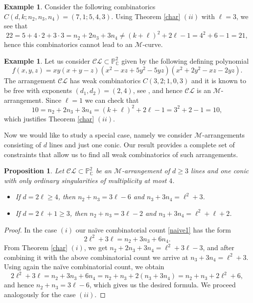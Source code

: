 \documentclass[11pt]{article}
\theoremstyle{plain}
\newtheorem{proposition}[theorem]{Proposition}
\theoremstyle{definition}
\newtheorem{example}[theorem]{Example}
\theoremstyle{remark}
\begin{document}
\begin{example}
Consider the following combinatorics $C(d,k;n_{2},n_{3},n_{4}) = (7,1;5,4,3)$. Using Theorem \ref{char} $(ii)$ with $\ell=3$, we see that
$$22= 5 + 4\cdot2 + 3\cdot 3 = n_{2} +2n_{3}+3n_{4} \neq (k+\ell)^2 + 2\ell - 1 = 4^2+6 - 1 = 21,$$
hence this combinatorics cannot lead to an $\mathscr{M}$-curve.
\end{example}
\begin{example}
Let us consider $\mathcal{CL}\subset \mathbb{P}^{2}_{\mathbb{C}}$ given by the following defining polynomial
$$f(x,y,z)=xy(x+y-z)(x^2 - xz + 5y^2 - 5yz)(x^2+2y^2 - xz - 2yz).$$
The arrangement $\mathcal{CL}$ has weak combinatorics $C(3,2;1,0,3)$ and it is known to be free with exponents $(d_{1},d_{2})=(2,4)$, see \cite[Example 2.1]{ST}, and hence $\mathcal{CL}$ is an $\mathscr{M}$-arrangement. Since $\ell=1$ we can check that
$$10 = n_{2}+2n_{3}+3n_{4} = (k+\ell)^{2}+2\ell-1 = 3^2+2-1 = 10,$$
which justifies Theorem \ref{char} $(ii)$.
\end{example}
Now we would like to study a special case, namely we consider $\mathscr{M}$-arrangements consisting of $d$ lines and just one conic. Our result provides a complete set of constraints that allow us to find all weak combinatorics of such arrangements.
\begin{proposition}
\label{kon}
Let $\mathcal{CL} \subset \mathbb{P}^{2}_\mathbb{C}$ be an $\mathscr{M}$-arrangement of $d\geq 3$ lines and one conic with only ordinary singularities of multiplicity at most $4$.
\begin{itemize}
    \item[(i)] If $d=2\ell\geq 4$, then $n_{2}+n_{3}=3\ell-6$ and $n_{3}+3n_{4} = \ell^{2}+3$.
    \item[(ii)] If $d=2\ell+1\geq 3$, then $n_{2}+n_{3}=3\ell-2$ and $n_{3}+3n_{4}=\ell^{2}+\ell+2$.
\end{itemize}
\end{proposition}
\begin{proof}
In the case $(i)$ our na\"ive combinatorial count \eqref{naive1} has the form
$$2\ell^{2} + 3\ell = n_{2} + 3n_{3} + 6n_{4}.$$
From Theorem \ref{char} $(i)$, we get $n_{2}+2n_{3}+3n_{4} = \ell^{2}+3\ell-3$, and after combining it with the above combinatorial count we arrive at $n_{3} + 3n_{4} = \ell^{2}+3$. Using again the na\"ive combinatorial count, we obtain
$$2\ell^{2} + 3\ell = n_{2} + 3n_{3} + 6n_{4} = n_{2} + n_{3} + 2(n_{3}+3n_{4}) = n_{2}+n_{3} + 2\ell^{2}+6,$$
and hence $n_{2}+n_{3}=3\ell-6$, which gives us the desired formula. We proceed analogously for the case $(ii)$. 
\end{proof}
\end{document}
